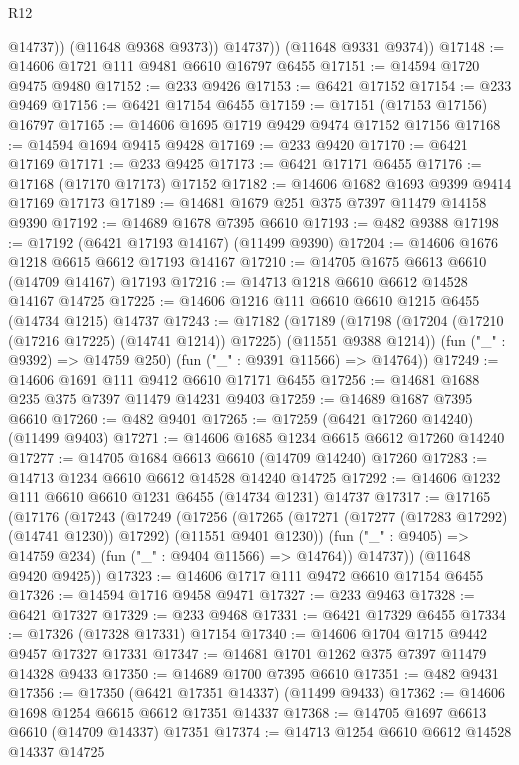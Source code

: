 \begin{lexlean}{R12}
\begin{coremodule}
{{{{{{{{{{{{{{{{{{{{{{{{{{{{{{{{{{{{{{{{{{{{{{{{{{{{{{{{{{{{{{{{{{{{{{{{{{{{{{{{{{                @14737))
            (@11648 @9368 @9373))
          @14737))
      (@11648 @9331 @9374))
@17148 := @14606 @1721 @111 @9481 @6610 @16797 @6455
@17151 := @14594 @1720 @9475 @9480
@17152 := @233 @9426
@17153 := @6421 @17152
@17154 := @233 @9469
@17156 := @6421 @17154 @6455
@17159 := @17151 (@17153 @17156) @16797
@17165 := @14606 @1695 @1719 @9429 @9474 @17152 @17156
@17168 := @14594 @1694 @9415 @9428
@17169 := @233 @9420
@17170 := @6421 @17169
@17171 := @233 @9425
@17173 := @6421 @17171 @6455
@17176 := @17168 (@17170 @17173) @17152
@17182 := @14606 @1682 @1693 @9399 @9414 @17169 @17173
@17189 := @14681 @1679 @251 @375 @7397 @11479 @14158 @9390
@17192 := @14689 @1678 @7395 @6610
@17193 := @482 @9388
@17198 := @17192 (@6421 @17193 @14167) (@11499 @9390)
@17204 := @14606 @1676 @1218 @6615 @6612 @17193 @14167
@17210 := @14705 @1675 @6613 @6610 (@14709 @14167) @17193
@17216 := @14713 @1218 @6610 @6612 @14528 @14167 @14725
@17225 := @14606 @1216 @111 @6610 @6610 @1215 @6455 (@14734 @1215) @14737
@17243 := @17182
    (@17189
      (@17198 (@17204 (@17210 (@17216 @17225) (@14741 @1214)) @17225) (@11551 @9388 @1214))
      (fun ("_" : @9392) => @14759 @250)
      (fun ("_" : @9391 @11566) => @14764))
@17249 := @14606 @1691 @111 @9412 @6610 @17171 @6455
@17256 := @14681 @1688 @235 @375 @7397 @11479 @14231 @9403
@17259 := @14689 @1687 @7395 @6610
@17260 := @482 @9401
@17265 := @17259 (@6421 @17260 @14240) (@11499 @9403)
@17271 := @14606 @1685 @1234 @6615 @6612 @17260 @14240
@17277 := @14705 @1684 @6613 @6610 (@14709 @14240) @17260
@17283 := @14713 @1234 @6610 @6612 @14528 @14240 @14725
@17292 := @14606 @1232 @111 @6610 @6610 @1231 @6455 (@14734 @1231) @14737
@17317 := @17165
    (@17176
      (@17243
        (@17249
          (@17256
            (@17265 (@17271 (@17277 (@17283 @17292) (@14741 @1230)) @17292) (@11551 @9401 @1230))
            (fun ("_" : @9405) => @14759 @234)
            (fun ("_" : @9404 @11566) => @14764))
          @14737))
      (@11648 @9420 @9425))
@17323 := @14606 @1717 @111 @9472 @6610 @17154 @6455
@17326 := @14594 @1716 @9458 @9471
@17327 := @233 @9463
@17328 := @6421 @17327
@17329 := @233 @9468
@17331 := @6421 @17329 @6455
@17334 := @17326 (@17328 @17331) @17154
@17340 := @14606 @1704 @1715 @9442 @9457 @17327 @17331
@17347 := @14681 @1701 @1262 @375 @7397 @11479 @14328 @9433
@17350 := @14689 @1700 @7395 @6610
@17351 := @482 @9431
@17356 := @17350 (@6421 @17351 @14337) (@11499 @9433)
@17362 := @14606 @1698 @1254 @6615 @6612 @17351 @14337
@17368 := @14705 @1697 @6613 @6610 (@14709 @14337) @17351
@17374 := @14713 @1254 @6610 @6612 @14528 @14337 @14725
}}}}}}}}}}}}}}}}}}}}}}}}}}}}}}}}}}}}}}}}}}}}}}}}}}}}}}}}}}}}}}}}}}}}}}}}}}}}}}}}}}
\end{coremodule}
\end{lexlean}
